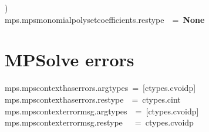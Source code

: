 \documentclass{article}\usepackage[]{graphicx}\usepackage[dvipsnames,table]{xcolor}
\makeatletter
\newcommand{\hlopt}[1]{\textcolor[rgb]{0,0,0}{#1}}%
\newcommand{\hldef}[1]{\textcolor[rgb]{0.345,0.345,0.345}{#1}}%
\newcommand{\hlkwa}[1]{\textcolor[rgb]{0.161,0.373,0.58}{\textbf{#1}}}%
\newenvironment{kframe}{%
 \def\at@end@of@kframe{}%
 \ifinner\ifhmode%
  \def\at@end@of@kframe{\end{minipage}}%
  \begin{minipage}{\columnwidth}%
 \fi\fi%
 \def\FrameCommand##1{\hskip\@totalleftmargin \hskip-\fboxsep
 \colorbox{shadecolor}{##1}\hskip-\fboxsep
     \hskip-\linewidth \hskip-\@totalleftmargin \hskip\columnwidth}%
 \MakeFramed {\advance\hsize-\width
   \@totalleftmargin\z@ \linewidth\hsize
   \@setminipage}}%
 {\par\unskip\endMakeFramed%
 \at@end@of@kframe}
\newenvironment{knitrout}{}{} %
\makeatother
\begin{document}
\begin{center}
\begin{minipage}[m]{15cm}
\begin{knitrout}
\begin{kframe}
\hldef{}\hlopt{)}\hldef{\ \ }\hlopt{}\hspace*{\fill}\\
\hldef{\textunderscore mps}\hlopt{.}\hldef{mps\textunderscore monomial\textunderscore poly\textunderscore set\textunderscore coefficient\textunderscore s}\hlopt{.}\hldef{restype}\hldef{\ \ }\hldef{}\hlopt{=\ }\hldef{}\hlkwa{None}\hldef{}\hspace*{\fill}
\mbox{}
\normalfont
\end{kframe}
\end{knitrout}
\end{minipage}
\end{center}

\newpage
\section{MPSolve errors}
\begin{center}
\begin{minipage}[m]{15cm}
\begin{knitrout}\small
{}\color{fgcolor}\begin{kframe}
\noindent
\ttfamily
\hldef{\textunderscore mps}\hlopt{.}\hldef{mps\textunderscore context\textunderscore has\textunderscore errors}\hlopt{.}\hldef{argtypes\ }\hlopt{=\ {[}}\hldef{ctypes}\hlopt{.}\hldef{c\textunderscore void\textunderscore p}\hlopt{{]}}\hspace*{\fill}\\
\hldef{\textunderscore mps}\hlopt{.}\hldef{mps\textunderscore context\textunderscore has\textunderscore errors}\hlopt{.}\hldef{restype}\hldef{\ \ }\hldef{}\hlopt{=\ }\hldef{ctypes}\hlopt{.}\hldef{c\textunderscore int}\hspace*{\fill}\\
\hldef{\textunderscore mps}\hlopt{.}\hldef{mps\textunderscore context\textunderscore error\textunderscore msg}\hlopt{.}\hldef{argtypes}\hldef{\ \ }\hldef{}\hlopt{=\ {[}}\hldef{ctypes}\hlopt{.}\hldef{c\textunderscore void\textunderscore p}\hlopt{{]}}\hspace*{\fill}\\
\hldef{\textunderscore mps}\hlopt{.}\hldef{mps\textunderscore context\textunderscore error\textunderscore msg}\hlopt{.}\hldef{restype}\hldef{\ \ \ }\hldef{}\hlopt{=\ }\hldef{ctypes}\hlopt{.}\hldef{c\textunderscore void\textunderscore p}\hldef{\ \ }\hldef{}\hldef{}\hspace*{\fill}
\mbox{}
\normalfont
\end{kframe}
\end{knitrout}
\end{minipage}
\end{center}
\end{document}
